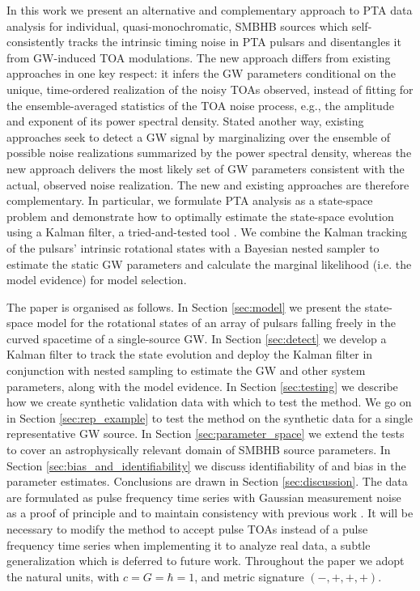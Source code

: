 \documentclass[fleqn,usenatbib,useAMS]{mnras}
\begin{document}
In this work we present an alternative and complementary approach to PTA data analysis for individual, quasi-monochromatic, SMBHB sources which self-consistently tracks the intrinsic timing noise in PTA pulsars and disentangles it from GW-induced TOA modulations. The new approach differs from existing approaches in one key respect: it infers the GW parameters conditional on the unique, time-ordered realization of the noisy TOAs observed, instead of fitting for the ensemble-averaged statistics of the TOA noise process, e.g., the amplitude and exponent of its power spectral density. Stated another way, existing approaches seek to detect a GW signal by marginalizing over the ensemble of possible noise realizations summarized by the power spectral density, whereas the new approach delivers the most likely set of GW parameters consistent with the actual, observed noise realization. The new and existing approaches are therefore complementary. In particular, we formulate PTA analysis as a state-space problem and demonstrate how to optimally estimate the state-space evolution using a Kalman filter, a tried-and-tested tool \citep{Kalman1,Meyers2021,Melatos2023}. We combine the Kalman tracking of the pulsars' intrinsic rotational states with a Bayesian nested sampler \citep{Skilling, Ashton2022} to estimate the static GW parameters and calculate the marginal likelihood (i.e. the model evidence) for model selection. \newline 


The paper is organised as follows. In Section \ref{sec:model} we present the state-space model for the rotational states of an array of pulsars falling freely in the curved spacetime of a single-source GW. In Section \ref{sec:detect} we develop a Kalman filter to track the state evolution and deploy the Kalman filter in conjunction with nested sampling to estimate the GW and other system parameters, along with the model evidence. In Section \ref{sec:testing} we describe how we create synthetic validation data with which to test the method. We go on in Section \ref{sec:rep_example} to test the method on the synthetic data for a single representative GW source. In Section \ref{sec:parameter_space} we extend the tests to cover an astrophysically relevant domain of SMBHB source parameters. In Section \ref{sec:bias_and_identifiability} we discuss identifiability of and bias in the parameter estimates. Conclusions are drawn in Section \ref{sec:discussion}. The data are formulated as pulse frequency time series with Gaussian measurement noise as a proof of principle and to maintain consistency with previous work \citep{Myers2021MNRAS.502.3113M,Meyers2021}. It will be necessary to modify the method to accept pulse TOAs instead of a pulse frequency time series when implementing it to analyze real data, a subtle generalization which is deferred to future work. Throughout the paper we adopt the natural units, with $c = G = \hbar = 1$, and metric signature $(-,+,+,+)$. \newline 
\end{document}
